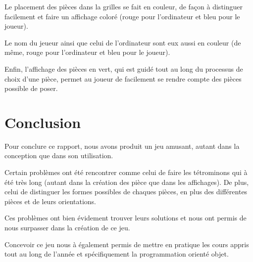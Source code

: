 \documentclass[a4paper, titlepage, french]{report}
\begin{document}
Le placement des pièces dans la grilles se fait en couleur, de façon à distinguer facilement et faire un affichage coloré (rouge pour l'ordinateur et bleu pour le joueur).
\bigskip

Le nom du jeueur ainsi que celui de l'ordinateur sont eux aussi en couleur (de même, rouge pour l'ordinateur et bleu pour le joueur).
\bigskip

Enfin, l'affichage des pièces en vert, qui est guidé tout au long du processus de choix d'une pièce, permet au joueur de facilement se rendre compte des pièces possible de poser.


\chapter{Conclusion}

Pour conclure ce rapport, nous avons produit un jeu amusant, autant dans la conception que dans son utilisation.
\bigskip

Certain problèmes ont été rencontrer comme celui de faire les tétrominons qui à été très long (autant dans la création des pièce que dans les affichages).
De plus, celui de distinguer les formes possibles de chaques pièces, en plus des différentes pièces et de leurs orientations.
\bigskip

Ces problèmes ont bien évidement trouver leurs solutions et nous ont permis de nous surpasser dans la création de ce jeu.
\bigskip

Concevoir ce jeu nous à également permis de mettre en pratique les cours appris tout au long de l'année et spécifiquement la programmation orienté objet.
\end{document}
